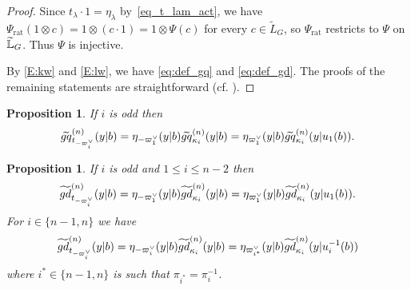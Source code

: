 \documentclass[a4paper]{amsart}
\newtheorem{prop}[thm]{Proposition}
\theoremstyle{remark}
\numberwithin{equation}{section}
\begin{document}
\begin{proof}
Since $t_\lambda\cdot 1=\eta_\lambda$ by~\eqref{eq_t_lam_act}, we have $\Psi_{\mathrm{rat}}(1\otimes c)=1\otimes(c\cdot 1)=1\otimes\Psi(c)$ for every $c\in\widetilde L_G$, so $\Psi_{\mathrm{rat}}$ restricts to $\Psi$ on $\widetilde{\mathbb{L}}_G$. Thus $\Psi$ is injective.



By \eqref{E:kw} and \eqref{E:lw}, we have
\eqref{eq:def_gq} and \eqref{eq:def_gd}. 
The proofs of the remaining statements
are straightforward (cf. \cite[Theorem 1.1]{ISY}).
\end{proof}


\begin{prop}
If $i$ is odd then
   $$\widetilde{gq}^{(n)}_{t_{-\varpi_i^\lor}}(y| b)=\eta_{-\varpi_1^\lor}(y| b)\widetilde{gq}^{(n)}_{\kappa_i}(y| b)=\eta_{\varpi_1^\lor}(y| b)\widetilde{gq}^{(n)}_{\kappa_i}(y| u_1(b)).$$ 
\end{prop}



\begin{prop}
If $i$ is odd and $1\leq i\leq n-2$ then
   $$\widetilde{gd}^{(n)}_{t_{-\varpi_i^\lor}}(y| b)=\eta_{-\varpi_1^\lor}(y| b)\widetilde{gd}^{(n)}_{\kappa_i}(y| b)=\eta_{\varpi_1^\lor}(y| b)\widetilde{gd}^{(n)}_{\kappa_i}(y| u_1(b)).$$
   For $i\in \{n-1, n\}$ we have 
   $$\widetilde{gd}^{(n)}_{t_{-\varpi_i^\lor}}(y| b)=\eta_{-\varpi_i^\lor}(y| b)\widetilde{gd}^{(n)}_{\kappa_i}(y| b)=\eta_{\varpi_{i^*}^\lor}(y| b)\widetilde{gd}^{(n)}_{\kappa_{i}}(y| u_{i}^{-1}(b))
   $$
   where $i^*\in \{n-1,n\}$ is such that $\pi_{i^*}=\pi_i^{-1}$.
\end{prop}
\end{document}
